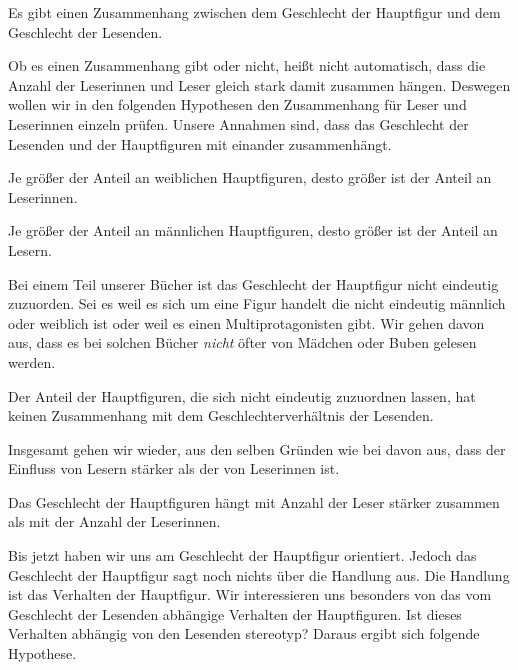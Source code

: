 \begin{hyp}
    Es gibt einen Zusammenhang zwischen dem Geschlecht der Hauptfigur
    und dem Geschlecht der Lesenden.
\end{hyp}

Ob es einen Zusammenhang gibt oder nicht, heißt nicht automatisch, dass
die Anzahl der Leserinnen und Leser gleich stark damit zusammen hängen.
Deswegen wollen wir in den folgenden Hypothesen den Zusammenhang für
Leser und Leserinnen einzeln prüfen. Unsere Annahmen sind, dass das
Geschlecht der Lesenden und der Hauptfiguren mit einander zusammenhängt.

\begin{subhyp}
       Je größer der Anteil an weiblichen Hauptfiguren,
        desto größer ist der Anteil an Leserinnen.
\end{subhyp}

\begin{subhyp}
       Je größer der Anteil an männlichen Hauptfiguren,
        desto größer ist der Anteil an Lesern.
\end{subhyp}

Bei einem Teil unserer Bücher ist das Geschlecht der Hauptfigur nicht
eindeutig zuzuorden. Sei es weil es sich um eine Figur handelt die nicht
eindeutig männlich oder weiblich ist oder weil es einen
Multiprotagonisten gibt. Wir gehen davon aus, dass es bei solchen Bücher
\emph{nicht} öfter von Mädchen oder Buben gelesen werden.

\begin{subhyp}
    Der Anteil der Hauptfiguren, die sich nicht eindeutig zuzuordnen lassen,   hat keinen Zusammenhang mit dem Geschlechterverhältnis der Lesenden.
\end{subhyp}

Insgesamt gehen wir wieder, aus den selben Gründen wie bei
 davon aus, dass der Einfluss von Lesern stärker als
der von Leserinnen ist.

\begin{subhyp}
   Das Geschlecht der Hauptfiguren hängt mit Anzahl der Leser stärker zusammen als mit der Anzahl der Leserinnen.
\end{subhyp}

Bis jetzt haben wir uns am Geschlecht der Hauptfigur orientiert. Jedoch
das Geschlecht der Hauptfigur sagt noch nichts über die Handlung aus.
Die Handlung ist das Verhalten der Hauptfigur. Wir interessieren uns
besonders von das vom Geschlecht der Lesenden abhängige Verhalten der
Hauptfiguren. Ist dieses Verhalten abhängig von den Lesenden stereotyp?
Daraus ergibt sich folgende Hypothese.

